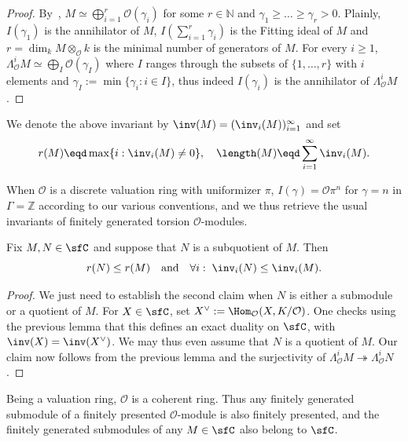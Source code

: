 \begin{proof}
By~\cite[6.1.14]{GaRa03}, $M\simeq\bigoplus_{i=1}^{r}\mathcal{O}(\gamma_{i})$ for some $r\in\mathbb{N}$ and $\gamma_{1}\geq\dots\geq\gamma_{r}>0$. Plainly, $I(\gamma_{1})$ is the annihilator of $M$, $I(\sum_{i=1}^{r}\gamma_{i})$ is the Fitting ideal of $M$ and $r=\dim_{k}M\otimes_{\mathcal{O}}k$ is the minimal number of generators of $M$. For every $i\geq1$, $\Lambda_{\mathcal{O}}^{i}M\simeq\bigoplus_{I}\mathcal{O}(\gamma_{I})$ where $I$ ranges through the subsets of $\{1,\dots,r\}$ with $i$ elements and $\gamma_{I}:=\min\{\gamma_{i}:i\in I\}$, thus indeed $I(\gamma_{i})$ is the annihilator of $\Lambda_{\mathcal{O}}^{i}M$.
\end{proof}

\begin{defi}
We denote the above invariant by $\inv(M)=(\inv_{i}(M))_{i=1}^{\infty}$ and set
\[
r(M)\eqd\max\{i:\inv_{i}(M)\neq0\},\quad\length(M)\eqd\sum_{i=1}^{\infty}\inv_{i}(M).
\]
\end{defi}

\begin{rema}
When $\mathcal{O}$ is a discrete valuation ring with uniformizer $\pi$, $I(\gamma)=\mathcal{O}\pi^{n}$ for $\gamma=n$ in $\Gamma=\mathbb{Z}$ according to our various conventions, and we thus retrieve the usual invariants of finitely generated torsion $\mathcal{O}$-modules.
\end{rema}

\begin{lemm}\label{lem:InvTorsOModdecUnderSubquo}
Fix $M,N\in\sfC$ and suppose that $N$ is a subquotient of $M$. Then
\[
r(N)\leq r(M)\quad\text{and}\quad\forall i:\;\inv_{i}(N)\leq\inv_{i}(M).
\]
\end{lemm}

\begin{proof}
We just need to establish the second claim when $N$ is either a submodule or a quotient of $M$. For $X\in\sfC$, set $X^{\vee}:=\Hom_{\mathcal{O}}(X,K/\mathcal{O})$. One checks using the previous lemma that this defines an exact duality on $\sfC$, with $\inv(X)=\inv(X^{\vee})$. We may thus even assume that $N$ is a quotient of $M$. Our claim now follows from the previous lemma and the surjectivity of $\Lambda_{\mathcal{O}}^{i}M\twoheadrightarrow\Lambda_{\mathcal{O}}^{i}N$.
\end{proof}

Being a valuation ring, $\mathcal{O}$ is a coherent ring. Thus any finitely generated submodule of a finitely presented $\mathcal{O}$-module is also finitely presented, and the finitely generated submodules of any $M\in\sfC$ also belong to $\sfC$.

